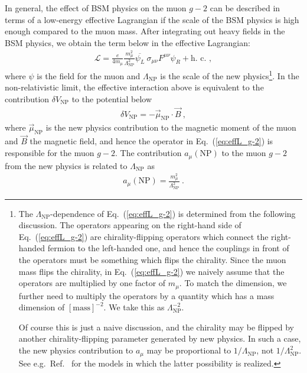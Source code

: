 In general, the effect of BSM physics on the muon $g-2$
can be described in terms of a low-energy effective Lagrangian
if the scale of the BSM physics is high enough compared to the
muon mass.   After integrating out heavy fields in the
BSM physics, we obtain the term below in the effective Lagrangian:
%
\begin{align}
 {\mathcal L} = \frac{e}{4 m_\mu}
 \frac{m_\mu^2}{\Lambda_{\text{NP}}^2} 
 \overline{\psi_L} ~ \sigma_{\mu\nu} F^{\mu\nu} \psi_R + {\text{h.\ c.\ }},
\label{eq:effL_g-2}
\end{align}
%
where $\psi$ is the field for the muon and
$\Lambda_{\text{NP}}$ is the scale of the new physics\footnote{
The $\Lambda_{\text{NP}}$-dependence of Eq.~(\ref{eq:effL_g-2})
is determined from the following discussion.  The
operators appearing on the right-hand side of Eq.~(\ref{eq:effL_g-2})
are chirality-flipping operators which connect the right-handed
fermion to the left-handed one, and hence the couplings in
front of the operators must be something which flips the chirality.
Since the muon mass flips the chirality, in 
Eq.~(\ref{eq:effL_g-2}) we naively assume that the operators
are multiplied by one factor of $m_\mu$.  To match the dimension,
we further need to multiply the operators by a quantity which
has a mass dimension of $[\text{mass}]^{-2}$.  
We take this as $\Lambda^{-2}_{\text{NP}}$.

Of course this is just a naive discussion, and the chirality
may be flipped by another chirality-flipping parameter generated
by new physics.  In such a case, the new physics contribution 
to $a_\mu$ may be proportional to $1/\Lambda_{\text{NP}}$,
not $1/\Lambda^2_{\text{NP}}$.  See e.g.\ Ref.~\cite{Czarnecki:2001pv}
for the models in which the latter possibility is realized.}.
In the non-relativistic limit, the effective interaction
above is equivalent to the contribution $\delta V_{\text{NP}}$
to the potential below
%
\begin{align}
 \delta V_{\text{NP}} = - \vec{\mu}_{\text{NP}} \cdot \vec{B}~,
\end{align}
%
where $\vec{\mu}_{\text{NP}}$ is the new physics
contribution to the magnetic moment of the muon and
$\vec{B}$ the magnetic field,
and hence the operator in Eq.~(\ref{eq:effL_g-2}) is
responsible for the muon $g-2$.
The contribution $a_\mu(\text{NP})$ to the muon $g-2$ from
the new physics is related to $\Lambda_{\text{NP}}$ as
%
\begin{align}
 a_\mu(\text{NP}) =  \frac{m_\mu^2}{\Lambda_{\text{NP}}^2} ~.
\end{align}
